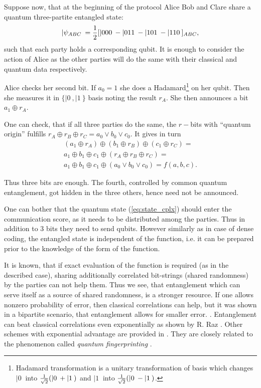 \documentclass[twocolumn,aps,rmp]{revtex4}
\begin{document}
Suppose now, that at the beginning of the protocol Alice Bob and Clare
share a quantum three-partite entangled state:
\begin{equation}
|\psi_{ABC}\> = {1\over 2}[|000\> - |011\> - |101\> - |110\>]_{ABC},
\label{eq:state_cplx}
\end{equation}
such that each party holds a corresponding qubit. It is enough to
consider the action of Alice as the other parties will do the same
with their classical and quantum data respectively.

Alice checks her second bit. If $a_0=1$ she does a
Hadamard\footnote{Hadamard transformation is a unitary transformation
  of basis which changes $|0\>$ into ${1\over \sqrt{2}}(|0\> + |1\>)$
  and $|1\>$ into ${1\over \sqrt{2}}(|0\> - |1\>)$.} on her
qubit. Then she measures it in $\{|0\>, |1\>\}$ basis noting the
result $r_A$. She then announces a bit $a_1\oplus r_A$.

One can check, that if all three parties do the same, the $r-$bits
with ``quantum origin'' fulfills $r_A\oplus r_B\oplus r_C =a_0\vee
b_0\vee c_0$. It gives in turn
\begin{eqnarray}
(a_1\oplus r_A)\oplus(b_1\oplus r_B)\oplus(c_1\oplus r_C)= \nonumber \\
a_1\oplus b_1\oplus c_1 \oplus (r_A\oplus r_B\oplus r_C)= \nonumber \\
a_1\oplus b_1 \oplus c_1 \oplus(a_0\vee b_0\vee c_0) = f(a,b,c).
\end{eqnarray}

Thus three bits are enough. The fourth, controlled by common quantum
entanglement, got hidden in the three others, hence need not be
announced.

One can bother that the quantum state (\ref{eq:state_cplx}) should
enter the communication score, as it needs to be distributed among the
parties.  Thus in addition to $3$ bits they need to send qubits.
However similarly as in case of dense coding, the entangled state is
independent of the function, i.e. it can be prepared prior to the
knowledge of the form of the function.

It is known, that if exact evaluation of the function is required (as
in the described case), sharing additionally correlated bit-strings
(shared randomness) by the parties can not help them. Thus we see,
that entanglement which can serve itself as a source of shared
randomness, is a stronger resource. If one allows nonzero probability
of error, then classical correlations can help, but it was shown in a
bipartite scenario, that entanglement allows for smaller error.
\cite{BuhrmanCD1997-complexity}. Entanglement can beat classical
correlations even exponentially as shown by R. Raz
\cite{raz99exponential}. Other schemes with exponential advantage are
provided in \cite{GaKaKeWolf-class-cmplx-gap}. They are closely
related to the phenomenon called {\it quantum fingerprinting}
\cite{Qfprint,GaKeWo-fingerprint}.
\end{document}
